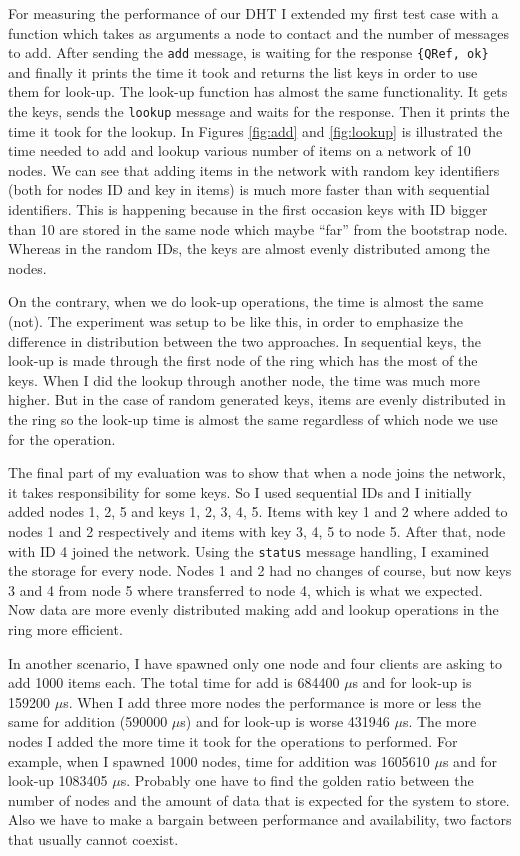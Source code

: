 \documentclass[a4paper, 10pt]{article}
\begin{document}
For measuring the performance of our DHT I extended my first test case with a
function which takes as arguments a node to contact and the number of messages
to add. After sending the \texttt{add} message, is waiting for the response
\texttt{\{QRef, ok\}} and finally it prints the time it took and returns the
list keys in order to use them for look-up. The look-up function has almost the
same functionality. It gets the keys, sends the \texttt{lookup} message and waits
for the response. Then it prints the time it took for the lookup. In Figures
\ref{fig:add} and \ref{fig:lookup} is illustrated the time needed to add and
lookup
various number of items on a network of 10 nodes. We can see that adding items
in the network with random key identifiers (both for nodes ID and key in items)
is much more faster than with sequential identifiers. This is happening because
in the first occasion keys with ID bigger than 10 are stored in the same node
which maybe ``far'' from the bootstrap node. Whereas in the random IDs, the keys
are almost evenly distributed among the nodes.

On the contrary, when we do look-up operations, the time is almost the same
(not). The experiment was setup to be like this, in order to emphasize the
difference in distribution between the two approaches. In sequential keys, the
look-up is made through the first node of the ring which has the most of the
keys. When I did the lookup through another node, the time was much more higher.
But in the case of random generated keys, items are evenly distributed in the
ring so the look-up time is almost the same regardless of which node we use for
the operation.

The final part of my evaluation was to show that when a node joins the network,
it takes responsibility for some keys. So I used sequential IDs and I initially
added nodes 1, 2, 5 and keys 1, 2, 3, 4, 5. Items with key 1 and 2 where added
to nodes 1 and 2 respectively and items with key 3, 4, 5 to node 5. After that,
node with ID 4 joined the network. Using the \texttt{status} message handling, I
examined the storage for every node. Nodes 1 and 2 had no changes of course, but
now keys 3 and 4 from node 5 where transferred to node 4, which is what we
expected. Now data are more evenly distributed making add and lookup operations
in the ring more efficient.

In another scenario, I have spawned only one node and four clients are asking to
add 1000 items each. The total time for add is 684400 $\mu$s and for look-up is
159200 $\mu$s. When I add three more nodes the performance is more or less the
same for addition (590000 $\mu$s) and for look-up is worse 431946 $\mu$s. The more
nodes I added the more time it took for the operations to performed. For
example, when I spawned 1000 nodes, time for addition was 1605610 $\mu$s and for
look-up 1083405 $\mu$s. Probably one have to find the golden ratio between the
number of nodes and the amount of data that is expected for the system to store.
Also we have to make a bargain between performance and availability, two factors
that usually cannot coexist.
\end{document}
